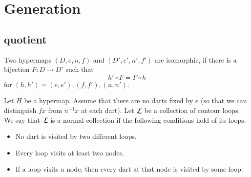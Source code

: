 %
%
%
%




\section{Generation}

\subsection{quotient}

\begin{definition}[isomorphic] Two hypermaps $(D,e,n,f)$ and $(D',e',n',f')$ are
isomorphic, if there is a bijection $F:D\to D'$ such that
    $$h'\circ F = F\circ h$$
for $(h,h')=(e,e'), (f,f'), (n,n')$.
\end{definition}


\begin{definition}
Let $H$ be a hypermap. Assume that 
there are no darts fixed by $e$ 
(so that we can distinguish $f x$
from $n^{-1} x$ at each dart). 
Let $\cal L$ be a collection of contour
loops.  We say that $\cal L$ is a normal collection if the following
conditions hold of its loops. \begin{itemize}
 \item No dart is visited by two different loops.
 \item Every loop visits at least two nodes.
 \item If a loop visits a node, then every dart at that node is
 visited by some loop.
\end{itemize}
\end{definition}

